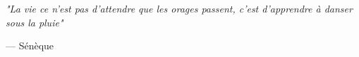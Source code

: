 \epigraph{\textit{"La vie ce n'est pas d'attendre que les orages passent, c'est d'apprendre \`a danser sous la pluie"}}{--- \textup{S\'en\`eque}}
